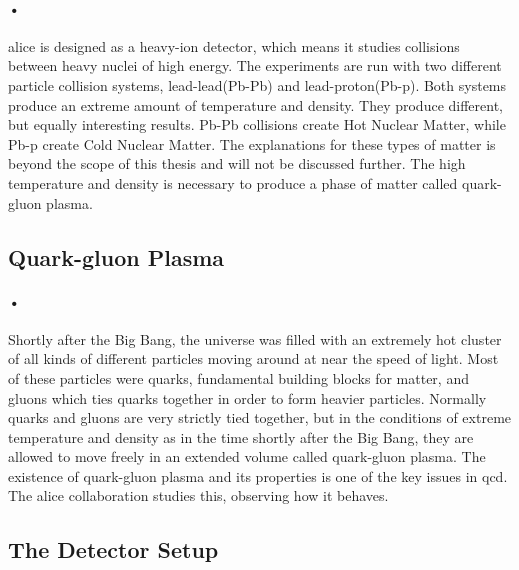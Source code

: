 \documentclass[a4paper, 12pt, openright, twoside]{report}
\begin{document}
\paragraph{•}
\gls{alice} is designed as a heavy-ion detector, which means it studies collisions between heavy nuclei of high energy\cite{alice-home}.
The experiments are run with two different particle collision systems, lead-lead(Pb-Pb) and lead-proton(Pb-p).
Both systems produce an extreme amount of temperature and density.
They produce different, but equally interesting results.
Pb-Pb collisions create Hot Nuclear Matter, while Pb-p create Cold Nuclear Matter.
The explanations for these types of matter is beyond the scope of this thesis and will not be discussed further.
The high temperature and density is necessary to produce a phase of matter called quark-gluon plasma.

\subsection{Quark-gluon Plasma}
\paragraph{•}
Shortly after the Big Bang, the universe was filled with an extremely hot cluster of all kinds of different particles moving around at near the speed of light\cite{alice-physics}.
Most of these particles were quarks, fundamental building blocks for matter, and gluons which ties quarks together in order to form heavier particles.
Normally quarks and gluons are very strictly tied together, but in the conditions of extreme temperature and density as in the time shortly after the Big Bang, they are allowed to move freely in an extended volume called quark-gluon plasma.
The existence of quark-gluon plasma and its properties is one of the key issues in \gls{qcd}.
The \gls{alice} collaboration studies this, observing how it behaves.

\subsection{The Detector Setup}
\end{document}
